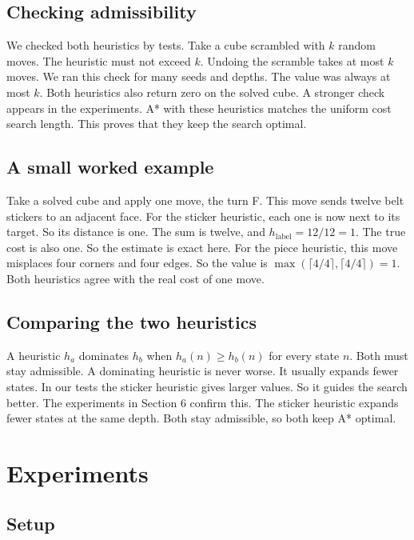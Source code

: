 \documentclass[11pt,a4paper]{article}
\begin{document}
\subsection{Checking admissibility}

We checked both heuristics by tests. Take a cube scrambled with $k$ random moves.
The heuristic must not exceed $k$. Undoing the scramble takes at most $k$ moves. We
ran this check for many seeds and depths. The value was always at most $k$. Both
heuristics also return zero on the solved cube. A stronger check appears in the
experiments. A* with these heuristics matches the uniform cost search length. This
proves that they keep the search optimal.

\subsection{A small worked example}

Take a solved cube and apply one move, the turn F. This move sends twelve belt
stickers to an adjacent face. For the sticker heuristic, each one is now next to
its target. So its distance is one. The sum is twelve, and
$h_{\text{label}} = 12 / 12 = 1$. The true cost is also one. So the estimate is
exact here. For the piece heuristic, this move misplaces four corners and four
edges. So the value is $\max(\lceil 4/4 \rceil, \lceil 4/4 \rceil) = 1$. Both
heuristics agree with the real cost of one move.

\subsection{Comparing the two heuristics}

A heuristic $h_a$ dominates $h_b$ when $h_a(n) \ge h_b(n)$ for every state $n$.
Both must stay admissible. A dominating heuristic is never worse. It usually
expands fewer states. In our tests the sticker heuristic gives larger values. So
it guides the search better. The experiments in Section 6 confirm this. The
sticker heuristic expands fewer states at the same depth. Both stay admissible, so
both keep A* optimal.

\section{Experiments}

\subsection{Setup}
\end{document}
